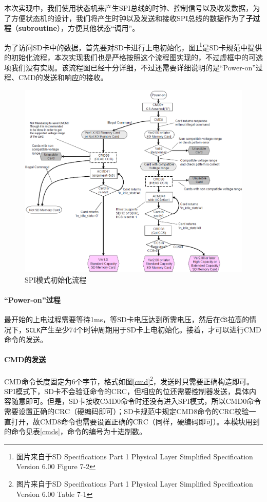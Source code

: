 \documentclass[11pt,utf8]{report}
\begin{document}
	\par 本次实现中，我们使用状态机来产生SPI总线的时钟、控制信号以及收发数据，为了方便状态机的设计，我们将产生时钟以及发送和接收SPI总线的数据作为了\textbf{子过程}（\textbf{subroutine}），方便其他状态“调用”。
	
	\par 为了访问SD卡中的数据，首先要对SD卡进行上电初始化，图\ref{spi_init}\footnote{图片来自于SD Specifications Part 1 Physical Layer Simplified Specification Version 6.00 Figure 7-2}是SD卡规范中提供的初始化流程，本次实现我们也是严格按照这个流程图实现的，不过虚框中的可选项我们没有实现。该流程图已经十分详细，不过还需要详细说明的是“Power-on”过程、CMD的发送和响应的接收。
	
	\begin{figure}[h!]
		\centering
		\includegraphics[width=\textwidth]{spi_init}
		\caption{SPI模式初始化流程}
		\label{spi_init}
	\end{figure}
	
	\paragraph{“Power-on”过程} 最开始的上电过程需要等待1ms，等SD卡电压达到所需电压，然后在$\mathtt{\overline{CS}}$拉高的情况下，\texttt{SCLK}产生至少74个时钟周期用于SD卡上电初始化。接着，才可以进行CMD命令的发送。

	\paragraph{CMD的发送} CMD命令长度固定为6个字节，格式如图\ref{cmd}\footnote{图片来自于SD Specifications Part 1 Physical Layer Simplified Specification Version 6.00 Table 7-1}，发送时只需要正确构造即可。SPI模式下，SD卡不会验证命令的CRC，但相应的位还需要控制器发送，具体内容随意即可。但是，SD卡接收CMD0命令时还没有进入SPI模式，所以CMD0命令需要设置正确的CRC（硬编码即可）；SD卡规范中规定CMD8命令的CRC校验一直打开，故CMD8命令也需要设置正确的CRC（同样，硬编码即可）。本模块用到的命令见表\ref{cmds}，命令的编号为十进制数。
	
\end{document}
